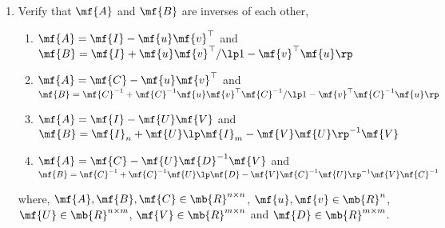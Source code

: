 \begin{enumerate}
    \item Verify that $\mf{A}$ and $\mf{B}$ are inverses of each other,
    \begin{enumerate}
        \item $\mf{A} = \mf{I} - \mf{u}\mf{v}^\top$ and $\mf{B} = \mf{I} + \mf{u}\mf{v}^\top / \lp 1 - \mf{v}^\top\mf{u} \rp$
        \item $\mf{A} = \mf{C} - \mf{u}\mf{v}^\top$ and $\mf{B} = \mf{C}^{-1} + \mf{C}^{-1}\mf{u}\mf{v}^\top\mf{C}^{-1} / \lp 1 - \mf{v}^\top\mf{C}^{-1}\mf{u} \rp$
        \item $\mf{A} = \mf{I} - \mf{U}\mf{V}$ and $\mf{B} = \mf{I}_{n} + \mf{U}\lp \mf{I}_m - \mf{V}\mf{U}\rp^{-1}\mf{V}$
        \item $\mf{A} = \mf{C} - \mf{U}\mf{D}^{-1}\mf{V}$ and $\mf{B} = \mf{C}^{-1} + \mf{C}^{-1}\mf{U}\lp \mf{D} - \mf{V}\mf{C}^{-1}\mf{U}\rp^{-1}\mf{V}\mf{C}^{-1}$
    \end{enumerate}
    where, $\mf{A}, \mf{B}, \mf{C} \in \mb{R}^{n \times n}$, $\mf{u}, \mf{v} \in \mb{R}^n$, $\mf{U} \in \mb{R}^{n \times m}$, $\mf{V} \in \mb{R}^{m \times n}$ and $\mf{D} \in \mb{R}^{m \times m}$.
\end{enumerate}